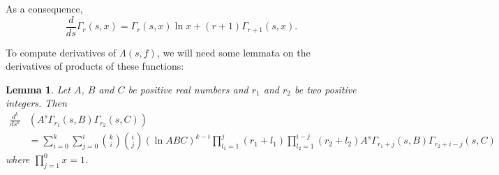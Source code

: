 \documentclass{article}
\theoremstyle{plain}
\newtheorem{lemma}{Lemma}
\begin{document}
As a consequence, 
\begin{equation*}
\frac{d}{ds} \Gamma_r(s,x)= \Gamma_r(s,x) \ln x +(r+1)\Gamma_{r+1}(s,x).
\end{equation*}

To compute derivatives of $\Lambda(s,f)$, we will need some lemmata on the derivatives of products of these functions:

\begin{lemma}\label{computation1}
Let $A$, $B$ and $C$ be positive real numbers and $r_1$ and $r_2$ be two positive integers. Then
\begin{equation*}
\begin{split}
\frac{d^k}{ds^k} & \left( A^{s} \Gamma_{r_1}(s,B) \Gamma_{r_2}(s, C)\right)\\
&= \sum_{i=0}^{k}\sum_{j=0}^{i}\binom{k}{i}\binom{i}{j} (\ln ABC)^{k-i} \prod_{l_1=1}^{j} (r_1+l_1) \prod_{l_2=1}^{i-j}(r_2+l_2)
A^{s} \Gamma_{r_1+j}(s,B) \Gamma_{r_2+i-j}(s, C)
\end{split}
\end{equation*}
where $\prod_{j=1}^{0} x =1$.
\end{lemma}
\end{document}
